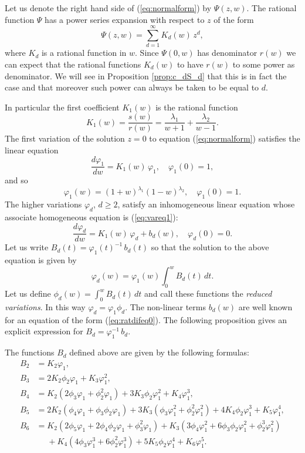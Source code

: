 Let us denote the right hand side of (\ref{eq:normalform}) by $\Psi(z,w)$. The rational function $\Psi$ has a power series expansion with respect to $z$ of the form
\begin{equation}\label{eq:expansionF}
\Psi(z,w)=\sum_{d=1}^{\infty}K_d(w)\,z^d,
\end{equation}
where $K_d$ is a rational function in $w$. Since $\Psi(0,w)$ has denominator $r(w)$ we can expect that the rational functions $K_d(w)$ to have $r(w)$ to some power as denominator. We will see in Proposition \ref{prop:c_dS_d} that this is in fact the case and that moreover such power can always be taken to be equal to $d$.

In particular the first coefficient $K_1(w)$ is the rational function
\[ K_1(w)=\frac{s(w)}{r(w)}=\frac{\lambda_1}{w+1}+\frac{\lambda_2}{w-1}. \]
The first variation of the solution $z=0$ to equation (\ref{eq:normalform}) satisfies the linear equation
\begin{equation}\label{eq:vareq1}
 \frac{d\varphi_1}{dw}=K_1(w)\,\varphi_1, \quad \varphi_1(0)=1,
\end{equation}
and so 
\begin{equation}\label{eq:expforvar1}
 \varphi_1(w)=(1+w)^{\lambda_1}(1-w)^{\lambda_2}, \quad \varphi_1(0)=1.
\end{equation}
The higher variations $\varphi_d$, $d\geq 2$, satisfy an inhomogeneous linear equation whose associate homogeneous equation is \textnormal{(\ref{eq:vareq1})}:
\[ \frac{d\varphi_d}{dw}=K_1(w)\,\varphi_d+b_d(w), \quad \varphi_d(0)=0. \]
Let us write $B_d(t)=\varphi_1(t)^{-1}\,b_d(t)$ so that the solution to the above equation is given by
\[ \varphi_d(w)=\varphi_1(w)\int_{0}^{w}B_d(t)\,dt. \]
Let us define $\phi_d(w)=\int_{0}^{w}B_d(t)\,dt$ and call these functions the \emph{reduced variations}. In this way $\varphi_d=\varphi_1\phi_d$. The non-linear terms $b_d(w)$ are well known for an equation of the form (\ref{eq:ratdifeq0}). The following proposition gives an explicit expression for $B_d=\varphi_1^{-1}\,b_d$.

\begin{proposition}\label{prop:formulasB_d}
The functions $B_d$ defined above are given by the following formulas:
\begin{align*}
B_2 & = K_2\varphi_1, \\
B_3 & = 2K_2\phi_2\varphi_1 + K_3\varphi_1^2, \\
B_4 & = K_2(2\phi_3\varphi_1+\phi_2^2\varphi_1) + 3K_3\phi_2\varphi_1^2 + K_4\varphi_1^3, \\
B_5 & = 2K_2(\phi_4\varphi_1+\phi_3\phi_2\varphi_1) + 3K_3(\phi_3\varphi_1^2+\phi_2^2\varphi_1^2) + 4K_4\phi_2\varphi_1^3 + K_5\varphi_1^4, \\
B_6 & = K_2(2\phi_5\varphi_1+2\phi_4\phi_2\varphi_1+\phi_3^2\varphi_1) + K_3(3\phi_4\varphi_1^2+6\phi_3\phi_2\varphi_1^2+\phi_2^3\varphi_1^2)\\ 
    &\phantom{=}+K_4(4\phi_3\varphi_1^3+6\phi_2^2\varphi_1^3) + 5K_5\phi_2\varphi_1^4 + K_6\varphi_1^5.
\end{align*}
\end{proposition}

